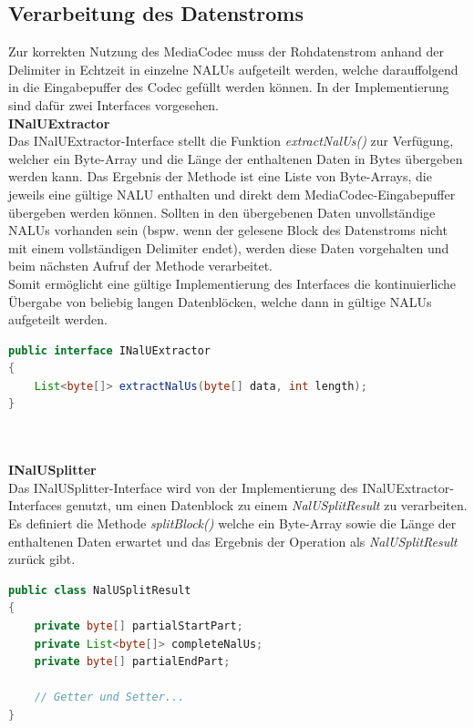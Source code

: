 \subsection{Verarbeitung des Datenstroms}
Zur korrekten Nutzung des MediaCodec muss der Rohdatenstrom anhand der Delimiter in Echtzeit in einzelne NALUs aufgeteilt werden, welche darauffolgend in die Eingabepuffer des Codec gefüllt werden können. In der Implementierung sind dafür zwei Interfaces vorgesehen.\\
\clearpage
\textbf{INalUExtractor}\\
Das INalUExtractor-Interface stellt die Funktion \textit{extractNalUs()} zur Verfügung, welcher ein Byte-Array und die Länge der enthaltenen Daten in Bytes übergeben werden kann. Das Ergebnis der Methode ist eine Liste von Byte-Arrays, die jeweils eine gültige NALU enthalten und direkt dem MediaCodec-Eingabepuffer übergeben werden können. Sollten in den übergebenen Daten unvollständige NALUs vorhanden sein (bspw. wenn der gelesene Block des Datenstroms nicht mit einem vollständigen Delimiter endet), werden diese Daten vorgehalten und beim nächsten Aufruf der Methode verarbeitet.\\
Somit ermöglicht eine gültige Implementierung des Interfaces die kontinuierliche Übergabe von beliebig langen Datenblöcken, welche dann in gültige NALUs aufgeteilt werden.\\
\begin{lstlisting}[caption=Definition des INaluUExtractor-Interface, label=lst:i_nalu_extractor, language=Java]
public interface INalUExtractor
{
    List<byte[]> extractNalUs(byte[] data, int length);
}
\end{lstlisting}
~\\
\\
\textbf{INalUSplitter}\\
Das INalUSplitter-Interface wird von der Implementierung des INalUExtractor-Interfaces genutzt, um einen Datenblock zu einem \textit{NalUSplitResult} zu verarbeiten. Es definiert die Methode \textit{splitBlock()} welche ein Byte-Array sowie die Länge der enthaltenen Daten erwartet und das Ergebnis der Operation als \textit{NalUSplitResult} zurück gibt.

\begin{lstlisting}[caption=Definition der NalUSplitResult-Klasse, label=lst:nalu_split_result, language=Java]
public class NalUSplitResult
{
    private byte[] partialStartPart;
    private List<byte[]> completeNalUs;
    private byte[] partialEndPart;
    
    // Getter und Setter...
}
\end{lstlisting}

